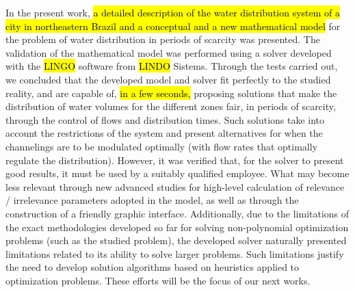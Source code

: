 \documentclass{singlecol}
\theoremstyle{TH}{
\newtheorem{lemma}{Lemma}
\newtheorem{theorem}[lemma]{Theorem}
\newtheorem{corrolary}[lemma]{Corrolary}
\newtheorem{conjecture}[lemma]{Conjecture}
\newtheorem{proposition}[lemma]{Proposition}
\newtheorem{claim}[lemma]{Claim}
\newtheorem{stheorem}[lemma]{Wrong Theorem}
\newtheorem{algorithm}{Algorithm}
}
\theoremstyle{THrm}{
\newtheorem{definition}{Definition}[section]
\newtheorem{question}{Question}[section]
\newtheorem{remark}{Remark}
\newtheorem{scheme}{Scheme}
}
\theoremstyle{THhit}{
\newtheorem{case}{Case}[section]
}
\begin{document}
In the present work, \hl{a detailed description of the water distribution system of a city in northeastern Brazil and a conceptual and a new mathematical model} for the problem of water distribution in periods of scarcity was presented. The validation of the mathematical model was performed using a solver developed with the \hl{LINGO} software from \hl{LINDO} Sistems. Through the tests carried out, we concluded that the developed model and solver fit perfectly to the studied reality, and are capable of, \hl{in a few seconds,} proposing solutions that make the distribution of water volumes for the different zones fair, in periods of scarcity, through the control of flows and distribution times. Such solutions take into account the restrictions of the system and present alternatives for when the channelings are to be modulated optimally (with flow rates that optimally regulate the distribution). However, it was verified that, for the solver to present good results, it must be used by a suitably qualified employee. What may become less relevant through new advanced studies for high-level calculation of relevance / irrelevance parameters adopted in the model, as well as through the construction of a friendly graphic interface.  Additionally, due to the limitations of the exact methodologies developed so far for solving non-polynomial optimization problems (such as the studied problem), the developed solver naturally presented limitations related to its ability to solve larger problems. Such limitations justify the need to develop solution algorithms based on heuristics applied to optimization problems. These efforts will be the focus of our next works.


\end{document}

